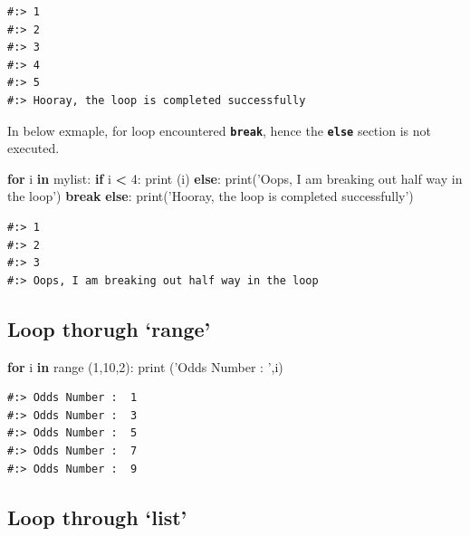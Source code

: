\documentclass[
]{book}
\newenvironment{Shaded}{\begin{snugshade}}{\end{snugshade}}
\newcommand{\BuiltInTok}[1]{#1}
\newcommand{\ControlFlowTok}[1]{\textcolor[rgb]{0.27,0.27,0.27}{\textbf{#1}}}
\newcommand{\DecValTok}[1]{\textcolor[rgb]{0.06,0.06,0.06}{#1}}
\newcommand{\KeywordTok}[1]{\textcolor[rgb]{0.27,0.27,0.27}{\textbf{#1}}}
\newcommand{\NormalTok}[1]{#1}
\newcommand{\OperatorTok}[1]{\textcolor[rgb]{0.43,0.43,0.43}{\textbf{#1}}}
\newcommand{\StringTok}[1]{\textcolor[rgb]{0.5,0.5,0.5}{#1}}
\begin{document}
\begin{verbatim}
#:> 1
#:> 2
#:> 3
#:> 4
#:> 5
#:> Hooray, the loop is completed successfully
\end{verbatim}

In below exmaple, for loop encountered \textbf{\texttt{break}}, hence the \textbf{\texttt{else}} section is not executed.

\begin{Shaded}
\begin{Highlighting}[]
\ControlFlowTok{for}\NormalTok{ i }\KeywordTok{in}\NormalTok{ mylist:}
  \ControlFlowTok{if}\NormalTok{ i }\OperatorTok{<} \DecValTok{4}\NormalTok{:}
    \BuiltInTok{print}\NormalTok{ (i)}
  \ControlFlowTok{else}\NormalTok{:}
    \BuiltInTok{print}\NormalTok{(}\StringTok{'Oops, I am breaking out half way in the loop'}\NormalTok{)}
    \ControlFlowTok{break}
\ControlFlowTok{else}\NormalTok{:}
  \BuiltInTok{print}\NormalTok{(}\StringTok{'Hooray, the loop is completed successfully'}\NormalTok{)}
\end{Highlighting}
\end{Shaded}

\begin{verbatim}
#:> 1
#:> 2
#:> 3
#:> Oops, I am breaking out half way in the loop
\end{verbatim}

\hypertarget{loop-thorugh-range}{%
\subsection{Loop thorugh `range'}\label{loop-thorugh-range}}

\begin{Shaded}
\begin{Highlighting}[]
\ControlFlowTok{for}\NormalTok{ i }\KeywordTok{in} \BuiltInTok{range}\NormalTok{ (}\DecValTok{1}\NormalTok{,}\DecValTok{10}\NormalTok{,}\DecValTok{2}\NormalTok{):}
    \BuiltInTok{print}\NormalTok{ (}\StringTok{'Odds Number : '}\NormalTok{,i) }
\end{Highlighting}
\end{Shaded}

\begin{verbatim}
#:> Odds Number :  1
#:> Odds Number :  3
#:> Odds Number :  5
#:> Odds Number :  7
#:> Odds Number :  9
\end{verbatim}

\hypertarget{loop-through-list}{%
\subsection{Loop through `list'}\label{loop-through-list}}
\end{document}
